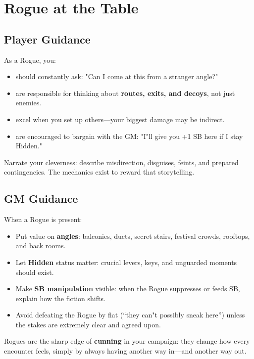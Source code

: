 \documentclass[11pt]{book}
\begin{document}
\section{Rogue at the Table}

\subsection{Player Guidance}

As a Rogue, you:
\begin{itemize}
  \item should constantly ask: "Can I come at this from a stranger angle?"
  \item are responsible for thinking about \textbf{routes, exits, and decoys},
        not just enemies.
  \item excel when you set up others---your biggest damage may be indirect.
  \item are encouraged to bargain with the GM:
        "I"ll give you +1 SB here if I stay Hidden."
\end{itemize}

Narrate your cleverness:
describe misdirection, disguises, feints, and prepared contingencies.
The mechanics exist to reward that storytelling.

\subsection{GM Guidance}

When a Rogue is present:
\begin{itemize}
  \item Put value on \textbf{angles}: balconies, ducts, secret stairs,
        festival crowds, rooftops, and back rooms.
  \item Let \textbf{Hidden} status matter:
        crucial levers, keys, and unguarded moments should exist.
  \item Make \textbf{SB manipulation} visible:
        when the Rogue suppresses or feeds SB, explain how the fiction shifts.
  \item Avoid defeating the Rogue by fiat (``they can"t possibly sneak here'')
        unless the stakes are extremely clear and agreed upon.
\end{itemize}

Rogues are the sharp edge of \textbf{cunning} in your campaign:
they change how every encounter feels, simply by always having
another way in---and another way out.
\end{document}
